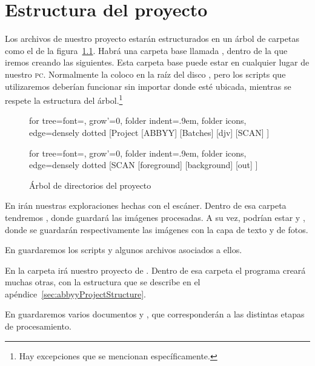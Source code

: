 \documentclass[%
	a5paper,
	10pt,
	twoside,
	openright,
	final,
]{memoir}
\begin{document}
{	\chapter{Estructura del proyecto} Los archivos de nuestro proyecto estarán estructurados en un árbol de carpetas como el de la figura~\ref{fig:projectStructure}. Habrá una carpeta base llamada , dentro de la que iremos creando las siguientes. Esta carpeta base puede estar en cualquier lugar de nuestro \textsc{pc}. Normalmente la coloco en la raíz del disco , pero los scripts que utilizaremos deberían funcionar sin importar donde esté ubicada, mientras se respete la estructura del árbol.\footnote{Hay excepciones que se mencionan específicamente.}

	\begin{figure}
		\hspace*{\fill}
		\begin{forest}
			for tree={font=\sffamily, grow'=0,
				folder indent=.9em, folder icons,
				edge=densely dotted}
			[Project
			[ABBYY]
			[Batches]
			[djv]
			[SCAN]
			]
		\end{forest}\hfill
		\begin{forest}
			for tree={font=\sffamily, grow'=0,
				folder indent=.9em, folder icons,
				edge=densely dotted}
			[SCAN
			[foreground]
			[background]
			[out]
			]
		\end{forest}%
		\hspace*{\fill}
		\caption{Árbol de directorios del proyecto\label{fig:projectStructure}}
	\end{figure}

	En  irán nuestras exploraciones hechas con el escáner. Dentro de esa carpeta tendremos , donde \scantailor guardará las imágenes procesadas. A su vez, podrían estar  y , donde se guardarán respectivamente las imágenes con la capa de texto y de fotos.

	En  guardaremos los scripts y algunos archivos asociados a ellos.

	En la carpeta  irá nuestro proyecto de \abbyy. Dentro de esa carpeta el programa creará muchas otras, con la estructura que se describe en el apéndice~\ref{sec:abbyyProjectStructure}.

	En  guardaremos varios documentos \pdf y \djvu, que corresponderán a las distintas etapas de procesamiento.

}
\end{document}
